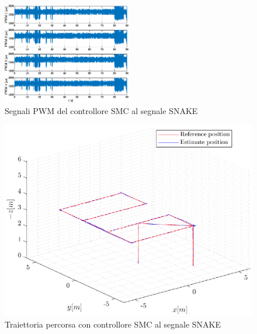 \begin{figure}
	\centering
	\includegraphics[width=0.5\textwidth]{Simulazioni/Figure/SMC/SNAKE/PWM}
	\caption{Segnali PWM del controllore SMC al segnale SNAKE}
	\label{fig:SNAKEPWMSMC}
\end{figure}
\begin{figure}
	\centering
	\includegraphics[width=1\textwidth]{Simulazioni/Figure/SMC/SNAKE/Trajectory}
	\caption{Traiettoria percorsa con controllore SMC al segnale SNAKE}
	\label{fig:SNAKEtraSMC}
\end{figure}

